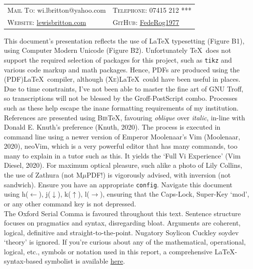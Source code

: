 \documentclass[11pt, english]{article}
\begin{document}
	\begin{center}
		\small
	\begin{tabular}{p{5.45cm}|p{5.45cm}}
		\textsc{Mail To:} wi.lbritton@yahoo.com & \textsc{Telephone:} 07415 212 ***\\
		\textsc{Website:} \href{http://lewisbritton.com}{lewisbritton.com} & \textsc{GitHub:} \href{https://github.com/FedeRog1977}{FedeRog1977}\\
	\end{tabular}
	\end{center}

	This document’s presentation reflects the use of {\LaTeX} typesetting (Figure B1), using Computer Modern Unicode (Figure B2). Unfortunately {\TeX}\ does not support the required selection of packages for this project, such as \texttt{tikz} and various code markup and math packages. Hence, PDFs are produced using the (PDF){\LaTeX}\ compiler, although (\textsc{Xe}){\LaTeX}\ could have been useful in places. Due to time constraints, I've not been able to master the fine art of GNU Troff, so transcriptions will not be blessed by the Groff-PostScript combo. Processes such as these help escape the inane formatting requirements of my institution. References are presented using \textsc{Bib}{\TeX}, favouring \textsl{oblique} over \textit{italic}, in-line with Donald E. Knuth’s preference (Knuth, 2020). The process is executed in command line using a newer version of Emperor Moolenaar's Vim (Moolenaar, 2020), neoVim, which is a very powerful editor that has many commands, too many to explain in a tutor such as this. It yields the `Full Vi Experience' (Vim Diesel, 2020). For maximum optical pleasure, such alike a photo of Lily Collins, the use of Zathura (not M$\mu$PDF!) is vigorously advised, with inversion (not sandwich). Ensure you have an appropriate \texttt{config}. Navigate this document using h($\leftarrow$), j($\downarrow$), k($\uparrow$), l($\rightarrow$), ensuring that the Caps-Lock, Super-Key `mod', or any other command key is not depressed.\\

	The Oxford Serial Comma is favoured throughout this text. Sentence structure focuses on pragmatics and syntax, disregarding bloat. Arguments are coherent, logical, definitive and straight-to-the-point. Nugatory Soylicon Cuckley soydev `theory' is ignored. If you're curious about any of the mathematical, operational, logical, etc., symbols or notation used in this report, a comprehensive {\LaTeX}-syntax-based symbolist is available \href{http://lewisbritton.com/Library.html/Writings/Symbol-List.pdf}{here}.\\
 
\end{document}
